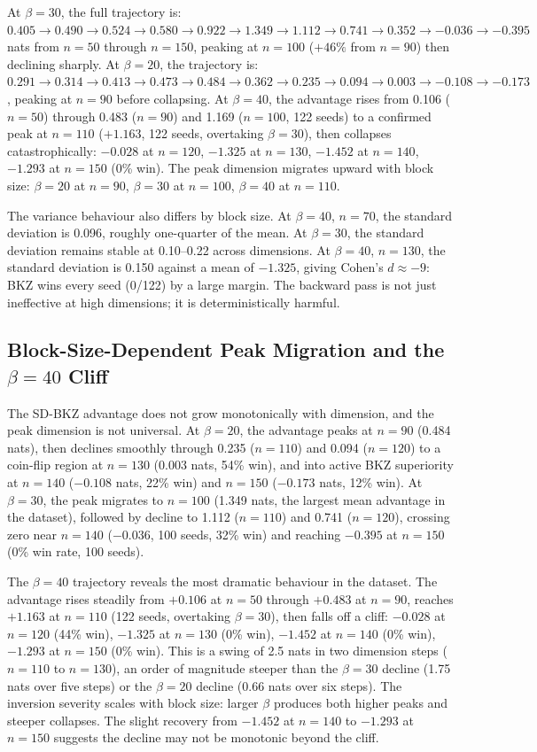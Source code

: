 \documentclass[journal=cic,version=preprint]{iacrj}
\begin{document}
At $\beta=30$, the full trajectory is: $0.405 \to 0.490 \to 0.524 \to 0.580 \to 0.922 \to 1.349 \to 1.112 \to 0.741 \to 0.352 \to -0.036 \to -0.395$ nats from $n=50$ through $n=150$, peaking at $n=100$ ($+46\%$ from $n=90$) then declining sharply. At $\beta=20$, the trajectory is: $0.291 \to 0.314 \to 0.413 \to 0.473 \to 0.484 \to 0.362 \to 0.235 \to 0.094 \to 0.003 \to -0.108 \to -0.173$, peaking at $n=90$ before collapsing. At $\beta=40$, the advantage rises from 0.106 ($n=50$) through 0.483 ($n=90$) and 1.169 ($n=100$, 122 seeds) to a confirmed peak at $n=110$ ($+1.163$, 122 seeds, overtaking $\beta=30$), then collapses catastrophically: $-0.028$ at $n=120$, $-1.325$ at $n=130$, $-1.452$ at $n=140$, $-1.293$ at $n=150$ (0\% win). The peak dimension migrates upward with block size: $\beta=20$ at $n=90$, $\beta=30$ at $n=100$, $\beta=40$ at $n=110$.

The variance behaviour also differs by block size. At $\beta=40$, $n=70$, the standard deviation is 0.096, roughly one-quarter of the mean. At $\beta=30$, the standard deviation remains stable at 0.10--0.22 across dimensions. At $\beta=40$, $n=130$, the standard deviation is 0.150 against a mean of $-1.325$, giving Cohen's $d\approx -9$: BKZ wins every seed (0/122) by a large margin. The backward pass is not just ineffective at high dimensions; it is deterministically harmful.

\subsection{Block-Size-Dependent Peak Migration and the $\beta=40$ Cliff}
\label{sec:peakmigration}

The SD-BKZ advantage does not grow monotonically with dimension, and the peak dimension is not universal. At $\beta=20$, the advantage peaks at $n=90$ (0.484 nats), then declines smoothly through 0.235 ($n=110$) and 0.094 ($n=120$) to a coin-flip region at $n=130$ (0.003 nats, 54\% win), and into active BKZ superiority at $n=140$ ($-0.108$ nats, 22\% win) and $n=150$ ($-0.173$ nats, 12\% win). At $\beta=30$, the peak migrates to $n=100$ (1.349 nats, the largest mean advantage in the dataset), followed by decline to 1.112 ($n=110$) and 0.741 ($n=120$), crossing zero near $n=140$ ($-0.036$, 100 seeds, 32\% win) and reaching $-0.395$ at $n=150$ (0\% win rate, 100 seeds).

The $\beta=40$ trajectory reveals the most dramatic behaviour in the dataset. The advantage rises steadily from $+0.106$ at $n=50$ through $+0.483$ at $n=90$, reaches $+1.163$ at $n=110$ (122 seeds, overtaking $\beta=30$), then falls off a cliff: $-0.028$ at $n=120$ (44\% win), $-1.325$ at $n=130$ (0\% win), $-1.452$ at $n=140$ (0\% win), $-1.293$ at $n=150$ (0\% win). This is a swing of 2.5 nats in two dimension steps ($n=110$ to $n=130$), an order of magnitude steeper than the $\beta=30$ decline (1.75 nats over five steps) or the $\beta=20$ decline (0.66 nats over six steps). The inversion severity scales with block size: larger $\beta$ produces both higher peaks and steeper collapses. The slight recovery from $-1.452$ at $n=140$ to $-1.293$ at $n=150$ suggests the decline may not be monotonic beyond the cliff.
\end{document}
